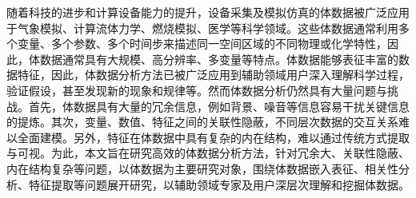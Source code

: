 \cleardoublepage
{}

随着科技的进步和计算设备能力的提升，设备采集及模拟仿真的体数据被广泛应用于气象模拟、计算流体力学、燃烧模拟、医学等科学领域。这些体数据通常利用多个变量、多个参数、多个时间步来描述同一空间区域的不同物理或化学特性，因此，体数据通常具有大规模、高分辨率、多变量等特点。体数据能够表征丰富的数据特征，因此，体数据分析方法已被广泛应用到辅助领域用户深入理解科学过程，验证假设，甚至发现新的现象和规律等。然而体数据分析仍然具有大量问题与挑战。首先，体数据具有大量的冗余信息，例如背景、噪音等信息容易干扰关键信息的提炼。其次，变量、数值、特征之间的关联性隐蔽，不同层次数据的交互关系难以全面建模。另外，特征在体数据中具有复杂的内在结构，难以通过传统方式提取与可视。为此，本文旨在研究高效的体数据分析方法，针对冗余大、关联性隐蔽、内在结构复杂等问题，以体数据为主要研究对象，围绕体数据嵌入表征、相关性分析、特征提取等问题展开研究，以辅助领域专家及用户深层次理解和挖掘体数据。

\cleardoublepage
{}